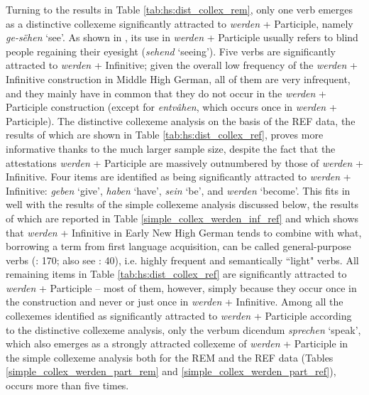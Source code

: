 \documentclass[output=paper,colorlinks,citecolor=brown]{langscibook}
\begin{document}
Turning to the results in Table \ref{tab:hs:dist_collex_rem}, only one verb emerges as a distinctive collexeme significantly attracted to \textit{werden} + Participle, namely \textit{ge-sëhen} `see'. As \linebreak shown in , its use in \textit{werden} + Participle usually refers to blind people regaining their eyesight (\textit{sehend} `seeing'). Five verbs are significantly attracted to \textit{werden} + Infinitive; given the overall low frequency of the \textit{werden} + Infinitive construction in Middle High German, all of them are very infrequent, and they mainly have in common that they do not occur in the \textit{werden} + Participle construction (except for \textit{entvâhen}, which occurs once in \textit{werden} + Participle). The distinctive collexeme analysis on the basis of the REF data, the results of which are shown in Table \ref{tab:hs:dist_collex_ref}, proves more informative thanks to the much larger sample size, despite the fact that the attestations \textit{werden} + Participle are massively outnumbered by those of \textit{werden} + Infinitive. Four items are identified as being significantly attracted to \textit{werden} + Infinitive: \textit{geben} `give', \textit{haben} `have', \textit{sein} `be', and \textit{werden} `become'. This fits in well with the results of the simple collexeme analysis discussed below, the results of which are reported in Table \ref{simple_collex_werden_inf_ref} and which shows that \textit{werden} + Infinitive in Early New High German tends to combine with what, borrowing a term from first language acquisition, can be called general-purpose verbs (\cite{clarkFirstLanguageAcquisition2009}: 170; also see \cite{goldbergConstructionsConstructionGrammar1995}: 40), i.e. highly frequent and semantically ``light" verbs. All remaining items in Table \ref{tab:hs:dist_collex_ref} are significantly attracted to \textit{werden} + Participle -- most of them, however, simply because they occur once in the construction and never or just once in \textit{werden} + Infinitive. Among all the collexemes identified as significantly attracted to \textit{werden} + Participle according to the distinctive collexeme analysis, only the verbum dicendum \textit{sprechen} `speak', which also emerges as a strongly attracted collexeme of \textit{werden} + Participle in the simple collexeme analysis both for the REM and the REF data (Tables \ref{simple_collex_werden_part_rem} and \ref{simple_collex_werden_part_ref}), occurs more than five times.
 
\end{document}
